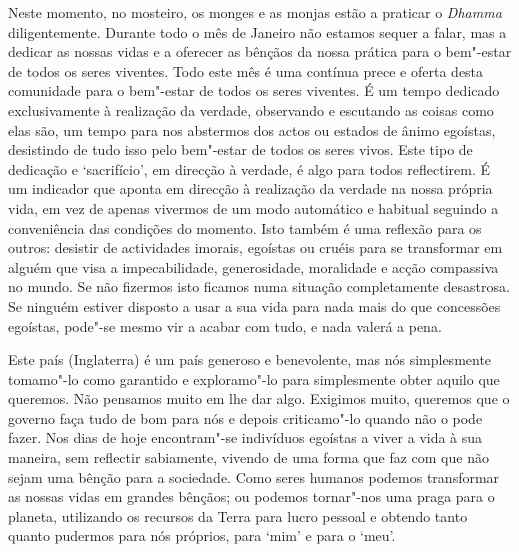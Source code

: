 Neste momento, no mosteiro, os monges e as monjas estão a praticar o
\emph{Dhamma} diligentemente. Durante todo o mês de Janeiro não estamos
sequer a falar, mas a dedicar as nossas vidas e a oferecer as bênçãos da
nossa prática para o bem"-estar de todos os seres viventes. Todo este mês
é uma contínua prece e oferta desta comunidade para o bem"-estar de todos
os seres viventes. É um tempo dedicado exclusivamente à realização da
verdade, observando e escutando as coisas como elas são, um tempo para
nos abstermos dos actos ou estados de ânimo egoístas, desistindo de tudo
isso pelo bem"-estar de todos os seres vivos. Este tipo de dedicação e
`sacrifício', em direcção à verdade, é algo para todos reflectirem. É um
indicador que aponta em direcção à realização da verdade na nossa
própria vida, em vez de apenas vivermos de um modo automático e habitual
seguindo a conveniência das condições do momento. Isto também é uma
reflexão para os outros: desistir de actividades imorais, egoístas ou
cruéis para se transformar em alguém que visa a impecabilidade,
generosidade, moralidade e acção compassiva no mundo. Se não fizermos
isto ficamos numa situação completamente desastrosa. Se ninguém estiver
disposto a usar a sua vida para nada mais do que concessões egoístas,
pode"-se mesmo vir a acabar com tudo, e nada valerá a pena.

Este país (Inglaterra) é um país generoso e benevolente, mas nós
simplesmente tomamo"-lo como garantido e exploramo"-lo para simplesmente 
obter aquilo que queremos. Não pensamos muito em lhe dar algo. Exigimos 
muito, queremos que o governo faça tudo de bom para nós e depois 
criticamo"-lo quando não o pode fazer. Nos dias de hoje encontram"-se 
indivíduos egoístas a viver a vida à sua maneira, sem reflectir sabiamente, 
vivendo de uma forma que faz com que não sejam uma bênção para a sociedade. 
Como seres humanos podemos transformar as nossas vidas em grandes bênçãos; 
ou podemos tornar"-nos uma praga para o planeta, utilizando os recursos 
da Terra para lucro pessoal e obtendo tanto quanto pudermos para nós 
próprios, para `mim' e para o `meu'.

